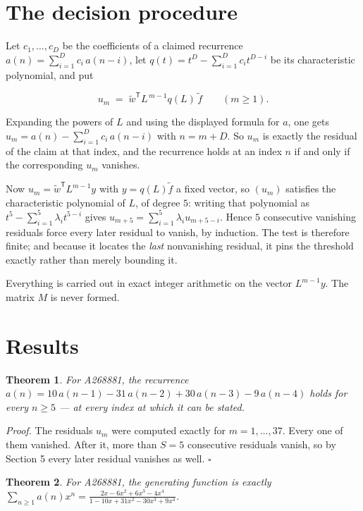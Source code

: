 \documentclass[11pt]{article}
\newtheorem{theorem}{Theorem}
\theoremstyle{definition}
\begin{document}
\section{The decision procedure}

Let $c_1,\dots,c_D$ be the coefficients of a claimed recurrence $a(n) = \sum_{i=1}^{D} c_i\,a(n-i)$, let $q(t) = t^{D} - \sum_{i=1}^{D} c_i t^{D-i}$ be its characteristic polynomial, and put

\[u_m \;=\; \tilde w^{\mathsf T} L^{\,m-1} q(L)\,\tilde f \qquad (m \ge 1).\]

Expanding the powers of $L$ and using the displayed formula for $a$, one gets $u_m = a(n) - \sum_{i=1}^{D} c_i\,a(n-i)$ with $n = m + D$. So $u_m$ is exactly the residual of the claim at that index, and the recurrence holds at an index $n$ if and only if the corresponding $u_m$ vanishes.

Now $u_m = \tilde w^{\mathsf T} L^{m-1} y$ with $y = q(L)\tilde f$ a fixed vector, so $(u_m)$ satisfies the characteristic polynomial of $L$, of degree $5$: writing that polynomial as $t^{5} - \sum_{i=1}^{5} \lambda_i t^{5-i}$ gives $u_{m+5} = \sum_{i=1}^{5} \lambda_i u_{m+5-i}$. Hence $5$ consecutive vanishing residuals force every later residual to vanish, by induction. The test is therefore finite; and because it locates the {\itshape last} nonvanishing residual, it pins the threshold exactly rather than merely bounding it.

Everything is carried out in exact integer arithmetic on the vector $L^{m-1}y$. The matrix $M$ is never formed.

\section{Results}

\begin{theorem} For A268881, the recurrence $a(n) = 10\,a(n-1) - 31\,a(n-2) + 30\,a(n-3) - 9\,a(n-4)$ holds for every $n \ge 5$ --- at every index at which it can be stated.\end{theorem}

{\itshape Proof.} The residuals $u_m$ were computed exactly for $m = 1,\dots,37$. Every one of them vanished. After it, more than $S = 5$ consecutive residuals vanish, so by Section 5 every later residual vanishes as well. $\square$

\begin{theorem} For A268881, the generating function is exactly $\sum_{n\ge 1} a(n)x^n = \frac{2x - 6x^{2} + 6x^{3} - 4x^{4}}{1 - 10x + 31x^{2} - 30x^{3} + 9x^{4}}$.\end{theorem}
\end{document}
